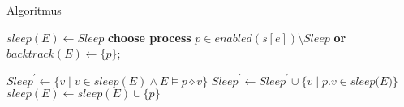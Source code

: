 \documentclass[11pt]{beamer}
\begin{document}


%
\begin{frame}[fragile]{Algoritmus}

\begin{algorithmic} \small
  \State $sleep(E) \gets Sleep$
  \State \textbf{choose process} $p \in \textit{enabled}(s[e]) \setminus \textit{Sleep}$
  \textbf{or} \Return
  \State $\textit{backtrack}(E) \gets \{ p \}$;
  
    \State {}
  
    \State $\textit{Sleep}^\prime \gets \{ v \mid v \in \textit{sleep}(E) \land E \vDash p \diamond v \}$
    \State $\textit{Sleep}^\prime \gets \textit{Sleep}^\prime \cup \{ v \mid p.v \in \textit{sleep(E)} \}$
    \State {}
    \State $\textit{sleep}(E) \gets \textit{sleep}(E) \cup \{ p \}$


  \EndWhile  
\EndFunction
\end{algorithmic}
\end{frame}
\end{document}
